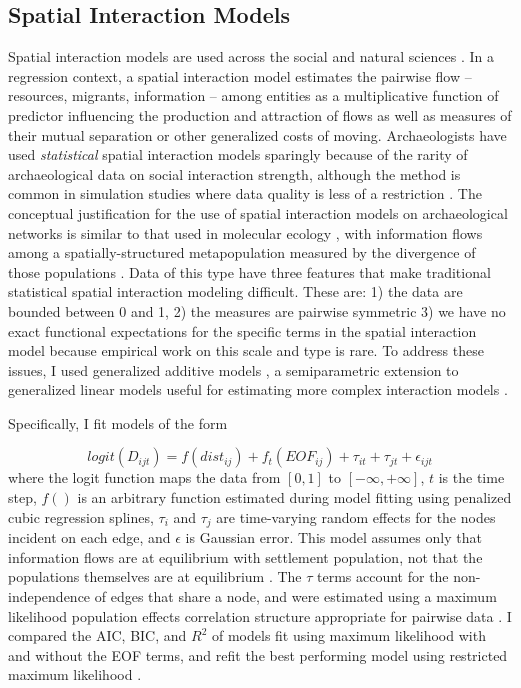 \documentclass[11pt]{iopart}
\begin{document}
\subsection*{Spatial Interaction Models}
Spatial interaction models are used across the social and natural sciences \parencite{Wilson1971,Fotheringham1989,Sen1995,Bavaud2008,Murphy2010,Head2015}. In a regression context, a spatial interaction model estimates the pairwise flow -- resources, migrants, information -- among entities as a multiplicative function of predictor influencing the production and attraction of flows as well as measures of their mutual separation or other generalized costs of moving. Archaeologists have used \textit{statistical} spatial interaction models sparingly \parencite{Tobler1971,Hodder1974,Johnson1990ChumashAnalysis} because of the rarity of archaeological data on social interaction strength, although the method is common in simulation studies where data quality is less of a restriction \parencite{Bevan2013, Evans2011, Davies2014,Paliou2016}. The conceptual justification for the use of spatial interaction models on archaeological networks is similar to that used in molecular ecology \parencite{Murphy2010}, with information flows among a spatially-structured metapopulation measured by the divergence of those populations \parencite{Mesoudi2018}. Data of this type have three features that make traditional statistical spatial interaction modeling difficult. These are: 1) the data are bounded between 0 and 1, 2) the measures are pairwise symmetric 3) we have no exact functional expectations for the specific terms in the spatial interaction model because empirical work on this scale and type is rare. To address these issues, I used generalized additive models \parencite{Wood2006a}, a semiparametric extension to generalized linear models useful for estimating more complex interaction models \parencite{Lebacher2018}.

Specifically, I fit models of the form

\begin{equation}
    logit\left(D_{ijt}\right) = f(dist_{ij}) + f_t(EOF_{ij}) + \tau_{it} + \tau_{jt} + \epsilon_{ijt}
\end{equation}
where the logit function maps the data from $[0, 1]$ to $[-\infty, +\infty]$, $t$ is the time step, $f()$ is an arbitrary function estimated during model fitting using penalized cubic regression splines, $\tau_i$ and $\tau_j$ are time-varying random effects for the nodes incident on each edge, and $\epsilon$ is Gaussian error. This model assumes only that information flows are at equilibrium with settlement population, not that the populations themselves are at equilibrium \parencite{Wilson2008}. The $\tau$ terms account for the non-independence of edges that share a node, and were estimated using a maximum likelihood population effects correlation structure appropriate for pairwise data \parencite{Clarke2002}. I compared the AIC, BIC, and $R^2$ of models fit using maximum likelihood with and without the EOF terms, and refit the best performing model using restricted maximum likelihood \parencite{Clarke2002,Shirk2018}. 
\end{document}
